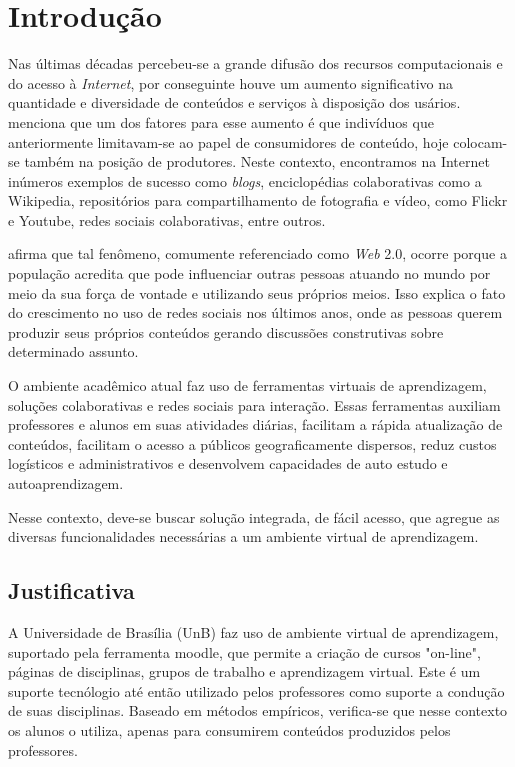 \chapter{Introdução}
\label{cap-introducao}

Nas últimas décadas percebeu-se a grande difusão dos recursos computacionais e do acesso à \textit{Internet}, por conseguinte houve um aumento significativo na quantidade e diversidade de conteúdos e serviços à disposição dos usários.  menciona que um dos fatores para esse aumento é que indivíduos que anteriormente limitavam-se ao papel de consumidores de conteúdo, hoje colocam-se também na posição de produtores. Neste contexto, encontramos na Internet inúmeros exemplos de sucesso como \textit{blogs}, enciclopédias colaborativas como a Wikipedia, repositórios para compartilhamento de fotografia e vídeo, como Flickr e Youtube, redes sociais colaborativas, entre outros.

\cite{castells2007era} afirma que tal fenômeno, comumente referenciado como \textit{Web} 2.0, ocorre porque a população acredita que pode influenciar outras pessoas atuando no mundo por meio da sua força de vontade e utilizando seus próprios meios. Isso explica o fato do crescimento no uso de redes sociais nos últimos anos, onde as pessoas querem produzir seus próprios conteúdos gerando discussões construtivas sobre determinado assunto.


O ambiente acadêmico atual faz uso de ferramentas virtuais de aprendizagem, soluções colaborativas e redes sociais para interação. Essas ferramentas auxiliam professores e alunos em suas atividades diárias, facilitam a rápida atualização de conteúdos, facilitam o acesso a públicos geograficamente dispersos, reduz custos logísticos e administrativos e desenvolvem capacidades de auto estudo e autoaprendizagem.

Nesse contexto, deve-se buscar solução integrada, de fácil acesso, que agregue  as diversas funcionalidades necessárias a um ambiente virtual de aprendizagem.

\section{Justificativa}

A Universidade de Brasília (UnB) faz uso de ambiente virtual de aprendizagem, suportado pela ferramenta moodle, que permite a criação de cursos "on-line", páginas de disciplinas, grupos de trabalho e aprendizagem virtual. Este é um suporte tecnólogio até então utilizado pelos professores como suporte a condução de suas disciplinas. Baseado em métodos empíricos, verifica-se que nesse contexto os alunos o utiliza, apenas para consumirem conteúdos produzidos pelos professores.

